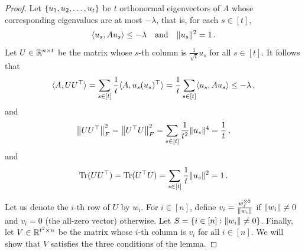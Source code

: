 \begin{proof}
    Let $\{u_1, u_2, \dots, u_t\}$ be $t$ orthonormal eigenvectors of $A$ whose corresponding eigenvalues are at most $-\lambda$, that is, for each $s \in [t]$,
    \begin{equation*}
        \langle u_s, A u_s\rangle \leq - \lambda \quad \text{and} \quad
        \lVert u_s\rVert^2 = 1 \,.
    \end{equation*}
    Let $U \in {\mathbb R}^{n \times t}$ be the matrix whose $s$-th column is $\frac{1}{\sqrt{t}} u_s$ for all $s \in [t]$.
    It follows that
    \begin{equation}
    \label{eq:spectral_construction_1}
        \iprod{A, U U^{\top}}
        = \sum_{s \in [t]} \frac{1}{t} \iprod{A, u_s (u_s)^{\top}}
        = \frac{1}{t} \sum_{s \in [t]} \iprod{u_s, A u_s}
        \leq - \lambda \,,
    \end{equation}
    and
    \begin{equation}
        \label{eq:spectral_construction_2}
            \Norm{U U^{\top}}_F^2
            = \Norm{U^{\top} U}_F^2
            = \sum_{s \in [t]} \frac{1}{t^2} \norm{u_s}^4
            = \frac{1}{t} \,,
    \end{equation}
    and
    \begin{equation}
    \label{eq:spectral_construction_3}
        \Tr(U U^{\top})
        = \Tr(U^{\top} U)
        = \sum_{s \in [t]} \frac{1}{t} \norm{u_s}^2
        = 1 \,.
    \end{equation}
    
    Let us denote the $i$-th row of $U$ by $w_i$.
    For $i \in [n]$, define $v_i = \frac{w_i^{\otimes 2}}{\lVert w_i\rVert}$ if $\lVert w_i\rVert \neq 0$ and $v_i = 0$ (the all-zero vector) otherwise. %
    Let $S = \left\{i \in [n]: \lVert w_i\rVert \neq 0\right\}$.
    Finally, let $V \in {\mathbb R}^{t^2 \times n}$ be the matrix whose $i$-th column is $v_i$ for all $i \in [n]$.
    We will show that $V$ satisfies the three conditions of the lemma.
    

\end{proof}
